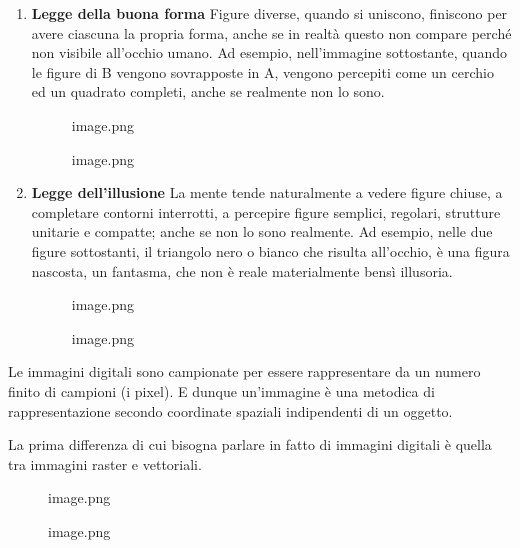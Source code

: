 \documentclass[
]{article}
\begin{document}
\begin{enumerate}
  \begin{figure}
  \centering
  {image.png}
  \caption{image.png}
  \end{figure}
\item
  \textbf{Legge della buona forma}
  Figure diverse, quando si uniscono, finiscono per avere ciascuna la propria forma, anche se in realtà questo non compare perché non visibile all'occhio umano. Ad esempio, nell'immagine sottostante, quando le figure di B vengono sovrapposte in A, vengono percepiti come un cerchio ed un quadrato completi, anche se realmente non lo sono.

  \begin{figure}
  \centering
  {image.png}
  \caption{image.png}
  \end{figure}
\item
  \textbf{Legge dell'illusione}
  La mente tende naturalmente a vedere figure chiuse, a completare contorni interrotti, a percepire figure semplici, regolari, strutture unitarie e compatte; anche se non lo sono realmente. Ad esempio, nelle due figure sottostanti, il triangolo nero o bianco che risulta all'occhio, è una figura nascosta, un fantasma, che non è reale materialmente bensì illusoria.

  \begin{figure}
  \centering
  {image.png}
  \caption{image.png}
  \end{figure}
\end{enumerate}

Le immagini digitali sono campionate per essere rappresentare da un numero finito di campioni (i pixel). E dunque un'immagine è una metodica di rappresentazione secondo coordinate spaziali indipendenti di un oggetto.

La prima differenza di cui bisogna parlare in fatto di immagini digitali è quella tra immagini raster e vettoriali.

\begin{figure}
\centering
{image.png}
\caption{image.png}
\end{figure}
\end{document}
